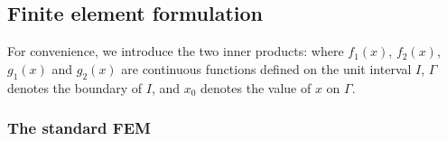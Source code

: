 \documentclass[review,3p]{elsarticle}
\begin{document}
\subsection{Finite element formulation} 	\label{FE formulation}

For convenience, we introduce the two inner products:
where $f_1(x)$, $f_2(x)$, $g_1(x)$ and $g_2(x)$ are continuous functions defined on the unit interval $I$, $\Gamma$ denotes the boundary of $I$, and $x_0$ denotes the value of $x$ on $\Gamma$.

\subsubsection{The standard FEM}
\end{document}
